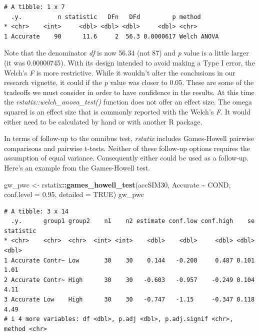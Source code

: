 \documentclass[
  11pt,
]{book}
\newenvironment{Shaded}{\begin{snugshade}}{\end{snugshade}}
\newcommand{\AttributeTok}[1]{\textcolor[rgb]{0.27,0.27,0.27}{#1}}
\newcommand{\ConstantTok}[1]{\textcolor[rgb]{0.37,0.37,0.37}{#1}}
\newcommand{\FloatTok}[1]{\textcolor[rgb]{0.06,0.06,0.06}{#1}}
\newcommand{\FunctionTok}[1]{\textcolor[rgb]{0.27,0.27,0.27}{\textbf{#1}}}
\newcommand{\NormalTok}[1]{#1}
\newcommand{\OtherTok}[1]{\textcolor[rgb]{0.37,0.37,0.37}{#1}}
\newcommand{\SpecialCharTok}[1]{\textcolor[rgb]{0.43,0.43,0.43}{\textbf{#1}}}
\begin{document}
\begin{verbatim}
# A tibble: 1 x 7
  .y.          n statistic   DFn   DFd         p method     
* <chr>    <int>     <dbl> <dbl> <dbl>     <dbl> <chr>      
1 Accurate    90      11.6     2  56.3 0.0000617 Welch ANOVA
\end{verbatim}

Note that the denominator \emph{df} is now 56.34 (not 87) and \emph{p} value is a little larger (it was 0.00000745). With its design intended to avoid making a Type I error, the Welch's \emph{F} is more restrictive. While it wouldn't alter the conclusions in our research vignette, it could if the \emph{p} value was closer to 0.05. These are some of the tradeoffs we must consider in order to have confidence in the results. At this time the \emph{rstatix::welch\_anova\_test()} function does not offer an effect size. The omega squared is an effect size that is commonly reported with the Welch's \emph{F}. It would either need to be calculated by hand or with another R package.

In terms of follow-up to the omnibus test, \emph{rstatix} includes Games-Howell pairwise comparisons and pairwise t-tests. Neither of these follow-up options requires the assumption of equal variance. Consequently either could be used as a follow-up. Here's an example from the Games-Howell test.

\begin{Shaded}
\begin{Highlighting}[]
\NormalTok{gw\_pwc }\OtherTok{\textless{}{-}}\NormalTok{ rstatix}\SpecialCharTok{::}\FunctionTok{games\_howell\_test}\NormalTok{(accSIM30, Accurate }\SpecialCharTok{\textasciitilde{}}\NormalTok{ COND, }\AttributeTok{conf.level =} \FloatTok{0.95}\NormalTok{,}
    \AttributeTok{detailed =} \ConstantTok{TRUE}\NormalTok{)}
\NormalTok{gw\_pwc}
\end{Highlighting}
\end{Shaded}

\begin{verbatim}
# A tibble: 3 x 14
  .y.      group1 group2    n1    n2 estimate conf.low conf.high    se statistic
* <chr>    <chr>  <chr>  <int> <int>    <dbl>    <dbl>     <dbl> <dbl>     <dbl>
1 Accurate Contr~ Low       30    30    0.144   -0.200     0.487 0.101      1.01
2 Accurate Contr~ High      30    30   -0.603   -0.957    -0.249 0.104      4.11
3 Accurate Low    High      30    30   -0.747   -1.15     -0.347 0.118      4.49
# i 4 more variables: df <dbl>, p.adj <dbl>, p.adj.signif <chr>, method <chr>
\end{verbatim}
\end{document}
